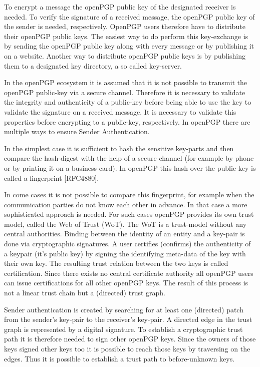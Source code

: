 To encrypt a message the openPGP public key of the designated receiver is needed. To verify the signature of a received message, the openPGP public key of the sender is needed, respectively. OpenPGP users therefore have to distribute their openPGP public keys. The easiest way to do perform this key-exchange is by sending the openPGP public key along with every message or by publishing it on a website. Another way to distribute openPGP public keys is by publishing them to a designated key directory, a so called key-server.


In the openPGP ecosystem it is assumed that it is not possible to transmit the openPGP public-key via a secure channel. Therefore it is necessary to validate the integrity and authenticity of a public-key before being able to use the key to validate the signature on a received message. It is necessary to validate this properties before encrypting to a public-key, respectively. In openPGP there are multiple ways to ensure Sender Authentication.

In the simplest case it is sufficient to hash the sensitive key-parts and then compare the hash-digest with the help of a secure channel (for example by phone or by printing it on a business card). In openPGP this hash over the public-key is called a fingerprint [RFC4880].


In come cases it is not possible to compare this fingerprint, for example when the communication parties do not know each other in advance. In that case a more sophisticated approach is needed. For such cases openPGP provides its own trust model, called the Web of Trust (WoT). The WoT is a trust-model without any central authorities. Binding between the identity of an entity and a key-pair is done via cryptographic signatures. A user certifies (confirms) the authenticity of a keypair (it's public key) by signing the identifying meta-data of the key with their own key. The resulting trust relation between the two keys is called certification. Since there exists no central certificate authority all openPGP users can issue certifications for all other openPGP keys. The result of this process is not a linear trust chain but a (directed) trust graph. 

Sender authentication is created by searching for at least one (directed) patch from the sender's key-pair to the receiver's key-pair. A directed edge in the trust graph is represented by a digital signature. To establish a cryptographic trust path it is therefore needed to sign other openPGP keys. Since the owners of those keys signed other keys too it is possible to reach those keys by traversing on the edges. Thus it is possible to establish a trust path to before-unknown keys.

